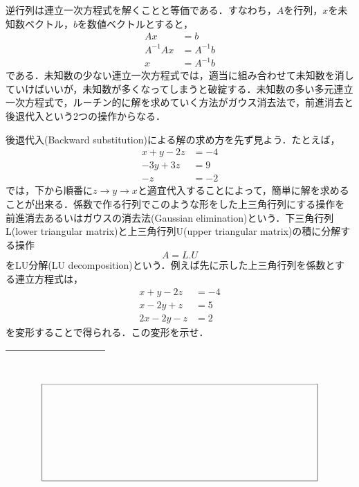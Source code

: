 逆行列は連立一次方程式を解くことと等価である．すなわち，$A$を行列，$x$を未知数ベクトル，$b$を数値ベクトルとすると，
\begin{equation*}
\begin{array}{rl} Ax &= b \\
A^{-1}Ax &= A^{-1}b \\
x &= A^{-1}b 
\end{array}
\end{equation*}
である．未知数の少ない連立一次方程式では，適当に組み合わせて未知数を消していけばいいが，未知数が多くなってしまうと破綻する．未知数の多い多元連立一次方程式で，ルーチン的に解を求めていく方法がガウス消去法で，前進消去と後退代入という2つの操作からなる．

後退代入(Backward substitution)による解の求め方を先ず見よう．たとえば，
\begin{equation*}
\begin{array}{rl}
x+y-2z & = -4 \\
-3y+3z & = 9\\
-z & = -2
\end{array}
\end{equation*}
では，下から順番に$z\rightarrow y\rightarrow x$と適宜代入することによって，簡単に解を求めることが出来る．係数で作る行列でこのような形をした上三角行列にする操作を前進消去あるいはガウスの消去法(Gaussian elimination)という．下三角行列L(lower triangular matrix)と上三角行列U(upper triangular matrix)の積に分解する操作
\begin{equation*}
A = L.U
\end{equation*}
をLU分解(LU decomposition)という．例えば先に示した上三角行列を係数とする連立方程式は，
\begin{equation*}
\begin{array}{rl}
x+y-2z&=-4 \\
x-2y+z&=5 \\
2x-2y-z&=2
\end{array}
\end{equation*}
を変形することで得られる．この変形を示せ．
\ifHIKI
\begin{tabular}{|c|}
\hline
　　　　　　　　 \\ 
\hline
\end{tabular}
\else
\begin{equation*}
\setlength{\unitlength}{1cm}
\begin{picture}(10,3.5)
\put(0,0){\framebox(10,3.5){}}
\end{picture}
\end{equation*}
\fi


  
